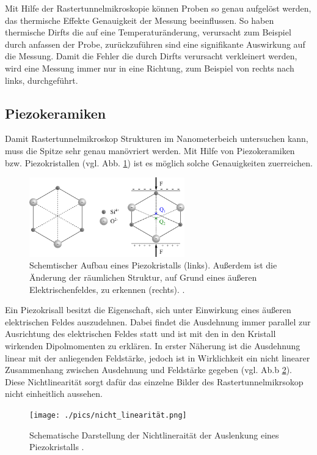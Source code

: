 Mit Hilfe der Rastertunnelmikroskopie können Proben so genau aufgelöst werden, das thermische Effekte
Genauigkeit der Messung beeinflussen. So haben thermische Dirfts die auf eine Temperaturänderung, verursacht zum Beispiel
durch anfassen der Probe, zurückzuführen sind eine signifikante Auswirkung auf die Messung.
Damit die Fehler die durch Dirfts verursacht verkleinert werden, wird eine Messung immer
nur in eine Richtung, zum Beispiel von rechts nach links, durchgeführt.

\subsection{Piezokeramiken}
Damit Rastertunnelmikroskop Strukturen im Nanometerbeich untersuchen kann, muss
die Spitze sehr genau manövriert werden. Mit Hilfe von Piezokeramiken bzw.
Piezokristallen (vgl. Abb. \ref{fig: piezo}) ist es möglich solche Genauigkeiten zuerreichen.
\begin{figure}[!h]
  \centering
  \includegraphics[width=0.6\textwidth]{./pics/piezo.png}
  \caption{Schemtischer Aufbau eines Piezokristalls (links). Außerdem ist die Änderung der räumlichen Struktur, auf Grund eines
  äußeren Elektrischenfeldes, zu erkennen (rechts). \cite{piezo}.}
  \label{fig: piezo}
\end{figure}
Ein Piezokrisall besitzt die Eigenschaft, sich unter Einwirkung eines äußeren
elektrischen Feldes auszudehnen. Dabei findet die Ausdehnung immer parallel zur
Ausrichtung des elektrischen Feldes statt und ist mit den in den Kristall wirkenden
Dipolmomenten zu erklären. In erster Näherung ist die Ausdehnung linear mit der anliegenden Feldstärke,
jedoch ist in Wirklichkeit ein nicht linearer Zusammenhang zwischen Ausdehnung und Feldstärke
gegeben (vgl. Ab.b \ref{fig: non_linear}). Diese Nichtlinearität sorgt dafür das einzelne Bilder des
Rastertunnelmikrsokop nicht einheitlich aussehen.
\begin{figure}[!h]
  \centering
  \texttt{[image: ./pics/nicht\_linearität.png]}
  \caption{Schematische Darstellung der Nichtlineraität der Auslenkung eines Piezokristalls \cite{rtm}.}
  \label{fig: non_linear}
\end{figure}
